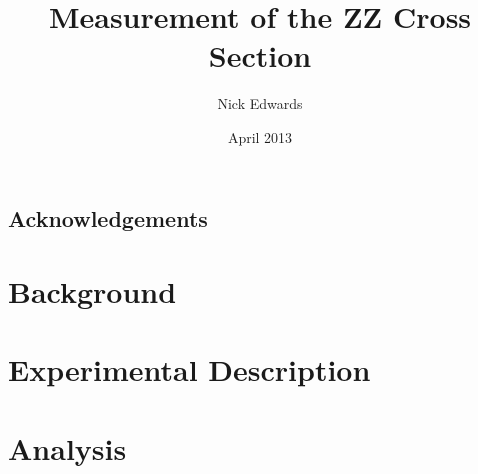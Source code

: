 \documentclass[a4paper,12pt]{report}
\begin{document}
\title{Measurement of the ZZ Cross Section}
\author{Nick Edwards}
\date{April 2013}

\maketitle

\tableofcontents
\listoffigures
\listoftables

\chapter*{Acknowledgements}

\begin{abstract}
\end{abstract}




\part{Background}





\part{Experimental Description}




%

\part{Analysis}












%


\end{document}
